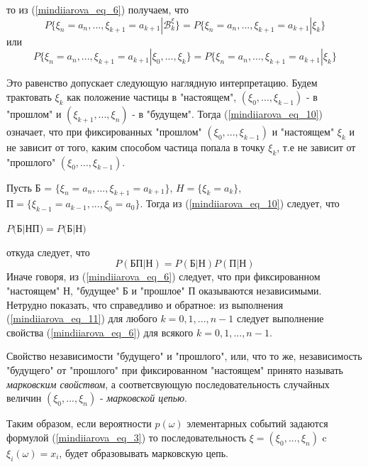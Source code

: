 то из (\ref{mindiiarova_eq_6}) получаем, что
\begin{equation} \label{mindiiarova_eq_9} 
P \{ \xi_n = a_n, ..., \xi_{k+1} = a_{k+1} | \mathscr{B}^{\xi}_k \} = P \{ \xi_n = a_n, ..., \xi_{k+1} = a_{k+1} | \xi_k\}
\end{equation}
или  
\begin{equation} \label{mindiiarova_eq_10} 
P \{ \xi_n = a_n, ..., \xi_{k+1} = a_{k+1} |\xi_0, ...,\xi_k  \} = P \{ \xi_n = a_n, ..., \xi_{k+1} = a_{k+1} | \xi_k\}
\end{equation}

Это равенство допускает следующую наглядную интерпретацию. Будем трактовать
$\xi_k$ как положение частицы в "настоящем",  $(\xi_0, ...,\xi_{k-1})$ - в "прошлом" и   $(\xi_{k+1}, ...,\xi_n)$ - в "будущем". Тогда (\ref{mindiiarova_eq_10}) означает, что при фиксированных "прошлом" $(\xi_0, ...,\xi_{k-1})$ и "настоящем"  $\xi_k$ и не зависит от того, каким способом частица попала в точку $\xi_k$, т.е не зависит от "прошлого" $(\xi_0, ...,\xi_{k-1})$.


Пусть $\text{Б}$ = $\{\xi_n = a_n, ..., \xi_{k+1} = a_{k+1}\} $, $H = \{\xi_k=a_k\}$, $ \text{П} =  \{\xi_{k-1} = a_{k-1}, ..., \xi_0 = a_0\}$.
Тогда из (\ref{mindiiarova_eq_10}) следует, что
\begin{center}
$P($Б$|$НП$) = P($Б$|$Н$)$
\end{center} 
откуда следует, что
\begin{equation} \label{mindiiarova_eq_11} 
P(\text{БП|Н}) = P(\text{Б|Н})P(\text{П|Н})
\end{equation}
Иначе говоря, из (\ref{mindiiarova_eq_6}) следует, что при фиксированном "настоящем" Н, "будущее" Б и "прошлое" П оказываются независимыми. Нетрудно показать, что справедливо и обратное: из выполнения (\ref{mindiiarova_eq_11}) для любого $k = 0, 1, ..., n-1$
следует выполнение свойства (\ref{mindiiarova_eq_6}) для всякого $k = 0, 1, ..., n-1$.


Свойство независимости "будущего" и "прошлого", или, что то же, независимость "будущего" от "прошлого" при фиксированном "настоящем" принято называть \textit{марковским свойством}, а соответсвующую последовательность случайных величин   $(\xi_{0}, ...,\xi_n)$ - \textit{марковской цепью}.


Таким образом, если вероятности $p(\omega)$ элементарных событий задаются формулой (\ref{mindiiarova_eq_3}) то последовательность  $\xi = (\xi_0, ...,\xi_n)$ c $\xi_i(\omega)=x_i$, будет образовывать марковскую цепь.


